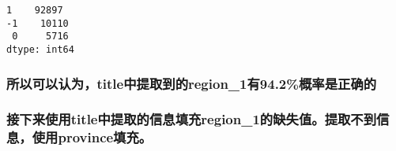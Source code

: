 \documentclass[11pt]{article}
\makeatletter
\newcommand{\boxspacing}{\kern\kvtcb@left@rule\kern\kvtcb@boxsep}
\newcommand{\prompt}[4]{
        {\ttfamily\llap{{\color{#2}[#3]:\hspace{3pt}#4}}\vspace{-\baselineskip}}
    }
\makeatother
\begin{document}
            \begin{tcolorbox}[breakable, size=fbox, boxrule=.5pt, pad at break*=1mm, opacityfill=0]
\prompt{Out}{outcolor}{50}{\boxspacing}
\begin{Verbatim}[commandchars=\\\{\}]
 1    92897
-1    10110
 0     5716
dtype: int64
\end{Verbatim}
\end{tcolorbox}
        
    \hypertarget{ux6240ux4ee5ux53efux4ee5ux8ba4ux4e3atitleux4e2dux63d0ux53d6ux5230ux7684region_1ux670994.2ux6982ux7387ux662fux6b63ux786eux7684}{%
\subsubsection{所以可以认为，title中提取到的region\_1有94.2\%概率是正确的}\label{ux6240ux4ee5ux53efux4ee5ux8ba4ux4e3atitleux4e2dux63d0ux53d6ux5230ux7684region_1ux670994.2ux6982ux7387ux662fux6b63ux786eux7684}}

\hypertarget{ux63a5ux4e0bux6765ux4f7fux7528titleux4e2dux63d0ux53d6ux7684ux4fe1ux606fux586bux5145region_1ux7684ux7f3aux5931ux503cux63d0ux53d6ux4e0dux5230ux4fe1ux606fux4f7fux7528provinceux586bux5145}{%
\subsubsection{接下来使用title中提取的信息填充region\_1的缺失值。提取不到信息，使用province填充。}\label{ux63a5ux4e0bux6765ux4f7fux7528titleux4e2dux63d0ux53d6ux7684ux4fe1ux606fux586bux5145region_1ux7684ux7f3aux5931ux503cux63d0ux53d6ux4e0dux5230ux4fe1ux606fux4f7fux7528provinceux586bux5145}}
\end{document}
